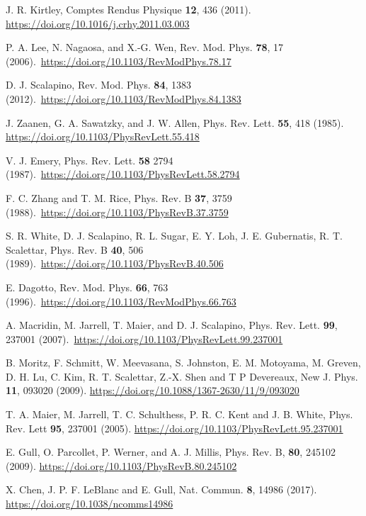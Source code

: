 \documentclass[reprint,nofootinbib,nobibnotes,amsmath,amssymb,aps,prb,floatfix]{revtex4-1}
\begin{document}
\begin{thebibliography}{99}
J. R. Kirtley, Comptes Rendus Physique {\bf 12}, 436 (2011). \url{https://doi.org/10.1016/j.crhy.2011.03.003}

P. A. Lee, N. Nagaosa, and X.-G. Wen, Rev. Mod. Phys.  {\bf 78}, 17 (2006).~\url{https://doi.org/10.1103/RevModPhys.78.17}

D. J. Scalapino, Rev. Mod. Phys. {\bf 84}, 1383 (2012).~\url{https://doi.org/10.1103/RevModPhys.84.1383}

J. Zaanen, G. A. Sawatzky, and J. W. Allen, Phys. Rev. Lett. {\bf 55}, 418 (1985). 
\url{https://doi.org/10.1103/PhysRevLett.55.418}

 V. J. Emery, Phys. Rev. Lett. {\bf 58} 2794 (1987).~\url{https://doi.org/10.1103/PhysRevLett.58.2794}

 F. C. Zhang and T. M. Rice, Phys. Rev. B {\bf 37}, 3759 (1988).~\url{https://doi.org/10.1103/PhysRevB.37.3759}

S. R. White, D. J. Scalapino, R. L. Sugar, E. Y. Loh, J. E. Gubernatis, R. T. Scalettar, Phys. Rev. B {\bf 40}, 506 (1989).~\url{https://doi.org/10.1103/PhysRevB.40.506}

 E. Dagotto, Rev. Mod. Phys. {\bf 66}, 763 (1996).~\url{https://doi.org/10.1103/RevModPhys.66.763}

A. Macridin, M. Jarrell, T. Maier, and D. J. Scalapino, Phys. Rev. Lett. {\bf 99}, 237001 (2007).~\url{https://doi.org/10.1103/PhysRevLett.99.237001}

 B. Moritz, F. Schmitt, W. Meevasana, S. Johnston,
E. M. Motoyama, M. Greven, D. H. Lu, C. Kim,
R. T. Scalettar, Z.-X. Shen and T P Devereaux, New J. Phys.
{\bf 11}, 093020 (2009). \url{https://doi.org/10.1088/1367-2630/11/9/093020}

 T. A. Maier, M. Jarrell, T. C. Schulthess, P. R. C. Kent and J. B. White, Phys. Rev. Lett {\bf 95}, 237001 (2005). \url{https://doi.org/10.1103/PhysRevLett.95.237001}

E. Gull, O. Parcollet, P. Werner, and A. J. Millis, Phys. Rev. B, {\bf 80}, 245102 (2009). \url{https://doi.org/10.1103/PhysRevB.80.245102}

X. Chen, J. P. F. LeBlanc and E. Gull, Nat. Commun. {\bf 8}, 14986 (2017). 
\url{https://doi.org/10.1038/ncomms14986}


\end{thebibliography}
\end{document}
